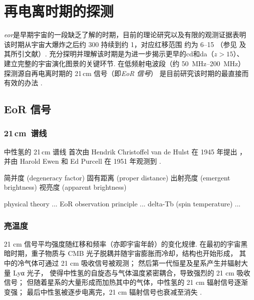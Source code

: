 
\chapter{再电离时期的探测}
\label{chap:detection}


\emph{\acf{eor}}是早期宇宙的一段缺乏了解的时期，目前的理论研究以及有限的观测证据表明
该时期从宇宙大爆炸之后约 \SI{300}{\Myr} 持续到约 \SI{1}{\Gyr}，对应红移范围
约为 \numrange{6}{15} （参见  及其所引文献）.
充分探明并理解该时期是为进一步揭示更早的\ac{cd}和\ac{da}（$z > 15$）、
建立完整的宇宙演化图景的关键环节.
在低频射电波段（约 \SIrange{50}{200}{\MHz}）
探测源自再电离时期的 21\,cm 信号（即\emph{EoR 信号}）
是目前研究该时期的最直接而有效的办法 \cite{madau1997,tozzi2000,furlanetto2006}.


\section{EoR 信号}
\label{sec:eor-signal}

\subsection{21\texorpdfstring{\,}{ }cm~谱线}

中性氢的 21\,cm 谱线
首次由 Hendrik Christoffel van de Hulst 在 1945 年提出 \cite{vanDeHulst1945}，
并由 Harold Ewen 和 Ed Purcell 在 1951 年观测到 \cite{ewen1951}.

简并度 (degeneracy factor)
固有距离 (proper distance)
出射亮度 (emergent brightness)
视亮度 (apparent brightness)

physical theory ...
EoR observation principle ...
delta-Tb (spin temperature) ...


\subsection{亮温度}

21 cm 信号平均强度随红移和频率（亦即宇宙年龄）的变化规律.
在最初的宇宙黑暗时期，重子物质与 CMB 光子脱耦并随宇宙膨胀而冷却，结构也开始形成，
其中的冷气体可通过 21 cm 吸收信号被观测；
然后第一代恒星及星系产生并辐射大量 Lyα 光子，
使得中性氢的自旋态与气体温度紧密耦合，导致强烈的 21 cm 吸收信号；
但随着星系的大量形成而加热其中的气体，中性氢的 21 cm 辐射信号逐渐变强；
最后中性氢被逐步电离完，21 cm 辐射信号也衰减至消失
\cite{pritchard2012}.


